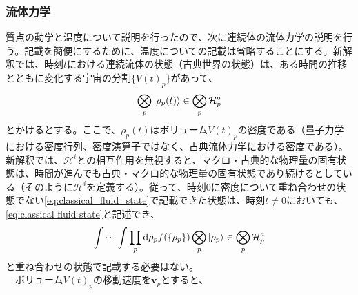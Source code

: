 \subsubsection{流体力学}
質点の動学と温度について説明を行ったので、次に連続体の流体力学の説明を行う。記載を簡便にするために、温度についての記載は省略することにする。新解釈では、時刻$t$における連続流体の状態（古典世界の状態）は、ある時間の推移とともに変化する宇宙の分割$\{V(t)_p\}$があって、
\begin{equation}
    \label{eq:classical_fluid_state}
    \bigotimes_p \ket{\rho_p(t)} \in \bigotimes_p \mathcal{H}_p^a
\end{equation}
とかけるとする。ここで、$\rho_p(t)$はボリューム$V(t)_p$の密度である（量子力学における密度行列、密度演算子ではなく、古典流体力学における密度である）。新解釈では、$\mathcal{H}^i$との相互作用を無視すると、マクロ・古典的な物理量の固有状態は、時間が進んでも古典・マクロ的な物理量の固有状態であり続けるとしている（そのように$\mathcal{H}^i$を定義する）。従って、時刻$0$に密度について重ね合わせの状態でない\eqref{eq:classical_fluid_state}で記載できた状態は、時刻$t \neq 0$においても、\eqref{eq:classical fluid state}と記述でき、
\begin{equation}
   \int \cdots \int \prod_p \mathrm{d}\rho_p f(\{\rho_p\}) \bigotimes_p \ket{\rho_p} \in \bigotimes_p \mathcal{H}_p^a
\end{equation}
と重ね合わせの状態で記載する必要はない。\\
　ボリューム$V(t)_p$の移動速度を$\bm{v}_p$とすると、